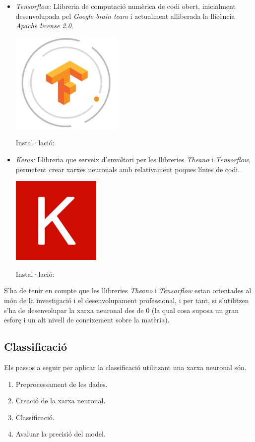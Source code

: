 \documentclass[12pt]{article}
\begin{document}
\begin{itemize}
	\item \textit{Tensorflow:} Llibreria de computació numèrica de codi obert, inicialment desenvolupada pel \textit{Google brain team} i actualment alliberada  la llicència \textit{Apache license 2.0}. 
	\begin{center}
		\includegraphics[scale=0.4]{imatges/eines/tensorflow.png}
	\end{center}
	Instal·lació: 
	
	\item \textit{Keras:} Llibreria que serveix d'envoltori per les llibreries \textit{Theano} i \textit{Tensorflow}, permetent crear xarxes neuronals amb relativament poques línies de codi.
	\begin{center}
		\includegraphics[scale=0.4]{imatges/eines/keras.png}	
	\end{center}
	Instal·lació: 
	
\end{itemize}
S'ha de tenir en compte que les llibreries \textit{Theano} i \textit{Tensorflow} estan orientades al món de la investigació i el desenvolupament professional, i per tant, si s'utilitzen s'ha de desenvolupar la xarxa neuronal des de 0 (la qual cosa suposa un gran esforç i un alt nivell de coneixement sobre la matèria).


\clearpage
\subsection{Classificació}
Els passos a seguir per aplicar la classificació utilitzant una xarxa neuronal són.
\begin{enumerate}
	\item Preprocessament de les dades.
	\item Creació de la xarxa neuronal.
	\item Classificació.
	\item Avaluar la precisió del model.
\end{enumerate}
\end{document}
